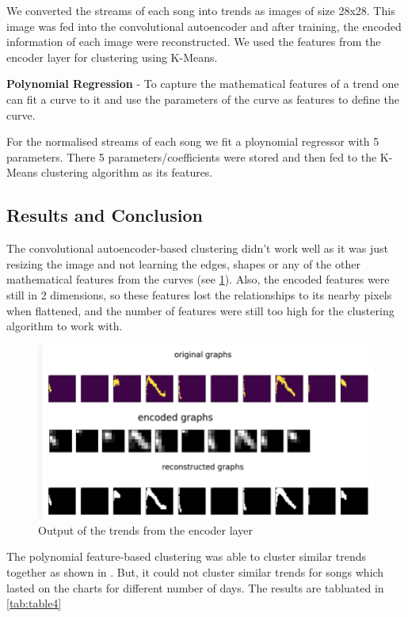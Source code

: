 \begin{appendix}
We converted the streams of each song into trends as images of size 28x28. This image was fed into the convolutional autoencoder and after training, the encoded information of each image were reconstructed. We used the features from the encoder layer for clustering using K-Means. 

\textbf{Polynomial Regression} -
To capture the mathematical features of a trend one can fit a curve to it and use the parameters of the curve as features to define the curve.

For the normalised streams of each song we fit a ploynomial regressor with 5 parameters. There 5 parameters/coefficients were stored and then fed to the K-Means clustering algorithm as its features.

\subsection{Results and Conclusion}
The convolutional autoencoder-based clustering didn't work well as it was just resizing the image and not learning the edges, shapes or any of the other mathematical features from the curves (see \ref{fig:caout}). Also, the encoded features were still in 2 dimensions, so these features lost the relationships to its nearby pixels when flattened, and the number of features were still too high for the clustering algorithm to work with.

\begin{figure}[h]
\centering
\centerline{\includegraphics[width=\textwidth]{Outputs/caout.png}}
\caption{Output of the trends from the encoder layer}
\label{fig:caout}
\end{figure}
The polynomial feature-based clustering was able to cluster similar trends together as shown in \label{fig:polyout} . But, it could not cluster similar trends for songs which lasted on the charts for different number of days. The results are tabluated in \ref{tab:table4}


\end{appendix}
